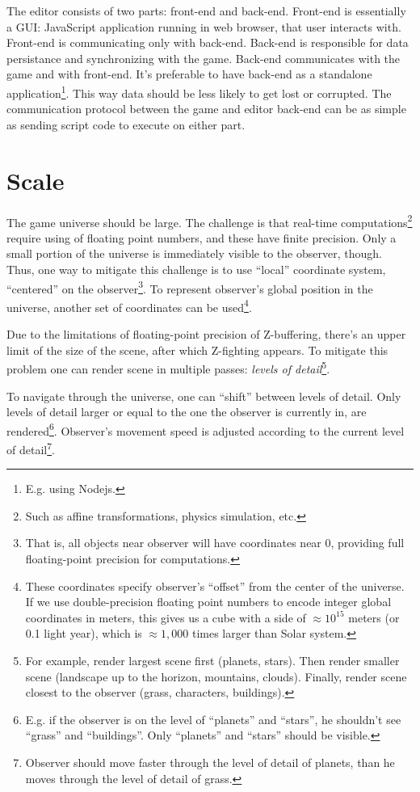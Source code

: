 \documentclass[12pt]{article}
\begin{document}
The editor consists of two parts: front-end and back-end.
Front-end is essentially a GUI: JavaScript application running in web
browser, that user interacts with.
Front-end is communicating only with back-end.
Back-end is responsible for data persistance and synchronizing with the game.
Back-end communicates with the game and with front-end.
It's preferable to have back-end as a standalone application\footnote{
    E.g. using Nodejs.
}.
This way data should be less likely to get lost or corrupted.
The communication protocol between the game and editor back-end can be
as simple as sending script code to execute on either part.

\section{Scale}

The game universe should be large.
The challenge is that real-time computations\footnote{
    Such as affine transformations, physics simulation, etc.
} require using of floating point numbers, and these have finite precision.
Only a small portion of the universe is immediately visible to the observer,
though.
Thus, one way to mitigate this challenge is to use ``local'' coordinate system,
``centered'' on the observer\footnote{
    That is, all objects near observer will have coordinates near \(0\),
    providing full floating-point precision for computations.
}.
To represent observer's global position in the universe, another set of
coordinates can be used\footnote{
    These coordinates specify observer's ``offset'' from the center of the
    universe.
    If we use double-precision floating point numbers to encode integer
    global coordinates in meters, this gives us a cube with a side of
    \(\approx 10^{15}\) meters (or 0.1 light year), which is \(\approx 1,000\)
    times larger than Solar system.
}.

Due to the limitations of floating-point precision of Z-buffering, there's an
upper limit of the size of the scene, after which Z-fighting appears.
To mitigate this problem one can render scene in multiple passes:
\emph{levels of detail}\footnote{
    For example, render largest scene first (planets, stars).
    Then render smaller scene (landscape up to the horizon, mountains, clouds).
    Finally, render scene closest to the observer
    (grass, characters, buildings).
}.

To navigate through the universe, one can ``shift'' between levels of detail.
Only levels of detail larger or equal to the one the observer is currently in,
are rendered\footnote{
    E.g. if the observer is on the level of ``planets'' and ``stars'',
    he shouldn't see ``grass'' and ``buildings''.
    Only ``planets'' and ``stars'' should be visible.}.
Observer's movement speed is adjusted according to the current level of
detail\footnote{
    Observer should move faster through the level of detail of planets,
    than he moves through the level of detail of grass.
}.
\end{document}
